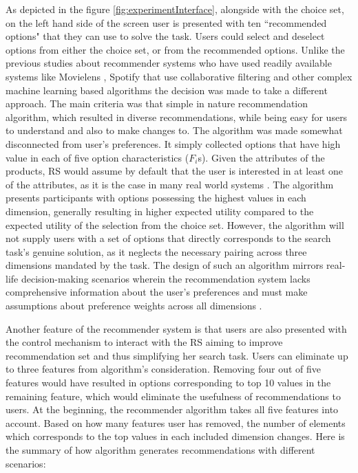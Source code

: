 \documentclass[a4paper,12pt]{article}
\begin{document}
As depicted in the figure \ref{fig:experimentInterface}, alongside with the choice set, on the left hand side of the screen user is presented with ten ``recommended options" that they can use to solve the task. Users could select and deselect options from either the choice set, or from the recommended options. Unlike the previous studies about recommender systems who have used readily available systems like Movielens \citep{movielens2018}, Spotify \citep{millecampControllingSpotifyRecommendations2018} that use collaborative filtering and other complex machine learning based algorithms the decision was made  to take a different approach. The main criteria was that simple in nature recommendation algorithm, which resulted in diverse recommendations, while being easy for users to understand and also to make changes to. The algorithm was made somewhat disconnected from user's preferences. It simply collected options that have high value in each of five option characteristics ($F_i$s). Given the attributes of the products, RS would assume by default that the user is interested in at least one of the attributes, as it is the case in many real world systems \citep{guAddressingColdStartProblem2019}. The algorithm presents participants with options possessing the highest values in each dimension, generally resulting in higher expected utility compared to the expected utility of the selection from the choice set. However, the algorithm will not supply users with a set of options that directly corresponds to the search task's genuine solution, as it neglects the necessary pairing across three dimensions mandated by the task. The design of such an algorithm mirrors real-life decision-making scenarios wherein the recommendation system lacks comprehensive information about the user's preferences and must make assumptions about preference weights across all dimensions \citep{scheinMethodsMetricsColdStart}.

Another feature of the recommender system is that users are also presented with the control mechanism to interact with the RS aiming to improve recommendation set and thus simplifying her search task. Users can eliminate up to three features from algorithm's consideration. Removing four out of five features would have resulted in options corresponding to top 10 values in the remaining feature, which would eliminate the usefulness of recommendations to users. At the beginning, the recommender algorithm takes all five features into account. Based on how many features user has removed, the number of elements which corresponds to the top values in each included dimension changes. Here is the summary of how algorithm generates recommendations with different scenarios:
\end{document}
